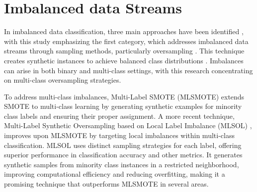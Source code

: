 %
%
\section{Imbalanced data Streams}
\label{sec:3_3_imbalanced}
In imbalanced data classification, three main approaches have been identified \cite{yin2022graph}, with this study emphasizing the first category, which addresses imbalanced data streams through sampling methods, particularly oversampling \cite{ren2023grouping}. This technique creates synthetic instances to achieve balanced class distributions \cite{nitesh2002smote, han2005borderline, bunkhumpornpat2009safe, maciejewski2011local}. Imbalances can arise in both binary and multi-class settings, with this research concentrating on multi-class oversampling strategies.

To address multi-class imbalances, Multi-Label SMOTE (MLSMOTE) \cite{charte2015mlsmote} extends SMOTE to multi-class learning by generating synthetic examples for minority class labels and ensuring their proper assignment. A more recent technique, Multi-Label Synthetic Oversampling based on Local Label Imbalance (MLSOL) \cite{yin2022graph}, improves upon MLSMOTE by targeting local imbalances within multi-class classification. MLSOL uses distinct sampling strategies for each label, offering superior performance in classification accuracy and other metrics. It generates synthetic samples from minority class instances in a restricted neighborhood, improving computational efficiency and reducing overfitting, making it a promising technique that outperforms MLSMOTE in several areas.